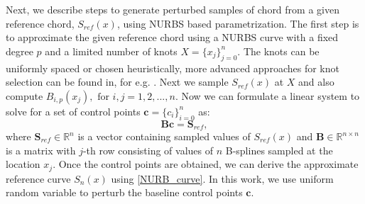 \documentclass[review]{elsarticle}
\numberwithin{equation}{section}
\numberwithin{equation}{section}
\begin{document}
Next, we describe steps to generate perturbed samples of chord from a given reference chord, $S_{ref}(x)$, using NURBS based parametrization. The first step is to approximate the given reference chord using a NURBS curve with a fixed degree $p$ and a limited number of knots $X =\{x_j\}_{j=0}^n$. The knots can be uniformly spaced or chosen heuristically, more advanced approaches for knot selection can be found in, for e.g. \cite{razdan1999knot,LI2005791}. Next we sample $S_{ref}(x)$ at $X$ and also compute $B_{i,p}(x_j), \text{ for }i, j = 1,2, ..., n$.  Now we can formulate a linear system to solve for a set of control points $\mathbf{c}=\{c_i\}_{i=0}^n$ as:
\begin{equation}\label{nurbs_inversion}
\mathbf{B}\mathbf{c} = \mathbf{S}_{ref},
\end{equation}
where $\mathbf{S}_{ref}\in\mathbb{R}^{n}$ is a vector containing sampled values of $S_{ref}(x)$ and $\mathbf{B}\in \mathbb{R}^{n\times n}$ is a matrix with $j$-th row consisting of values of $n$ B-splines sampled at the location $x_j$. Once the control points are obtained, we can derive the approximate reference curve $S_n(x)$ using \eqref{NURB_curve}. In this work, we use uniform random variable to perturb the baseline control points $\mathbf{c}$.
 
\end{document}
